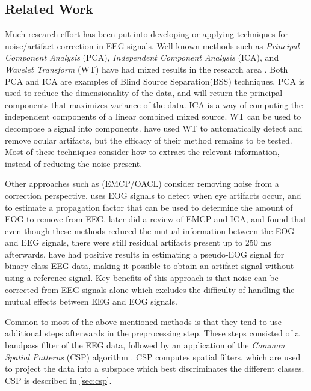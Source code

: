 \subsection{Related Work}
Much research effort has been put into developing or applying techniques for noise/artifact correction in EEG signals. Well-known methods such as \emph{Principal Component Analysis} (PCA), \emph{Independent Component Analysis} (ICA), and \emph{Wavelet Transform} (WT) have had mixed results in the research area \citep{uriguen2015eeg}. Both PCA and ICA are examples of Blind Source Separation(BSS) techniques, PCA is used to reduce the dimensionality of the data, and will return the principal components that maximizes variance of the data. ICA is a way of computing the independent components of a linear combined mixed source. WT can be used to decompose a signal into components. \cite{krishnaveni2006automatic} have used WT to automatically detect and remove ocular artifacts, but the efficacy of their method remains to be tested. Most of these techniques consider how to extract the relevant information, instead of reducing the noise present.

Other approaches such as (EMCP/OACL) consider removing noise from a correction perspective. \cite{gratton1983new} uses EOG signals to detect when eye artifacts occur, and to estimate a propagation factor that can be used to determine the amount of EOG to remove from EEG. \cite{hoffmann2008correction} later did a review of EMCP and ICA, and found that even though these methods reduced the mutual information between the EOG and EEG signals, there were still residual artifacts present up to 250 ms afterwards. \cite{li2015ocular} have had positive results in estimating a pseudo-EOG signal for binary class EEG data, making it possible to obtain an artifact signal without using a reference signal. Key benefits of this approach is that noise can be corrected from EEG signals alone which excludes the difficulty of handling the mutual effects between EEG and EOG signals.

Common to most of the above mentioned methods is that they tend to use additional steps afterwards in the preprocessing step. These steps consisted of a bandpass filter of the EEG data, followed by an application of the \emph{Common Spatial Patterns} (CSP) algorithm \citep{ramoser2000optimal}. CSP computes spatial filters, which are used to project the data into a subspace which best discriminates the different classes. CSP is described in \cref{sec:csp}.


